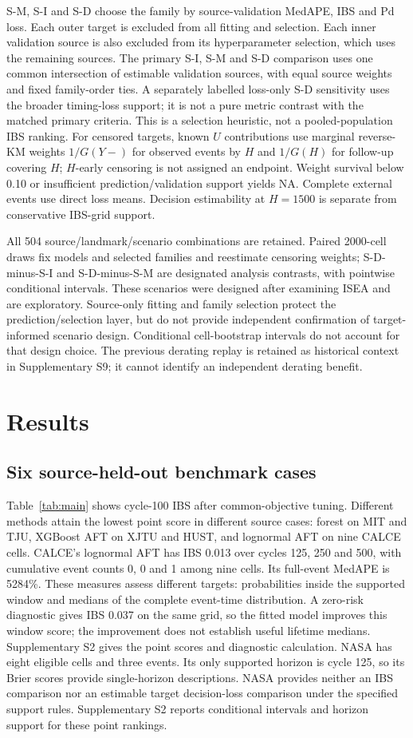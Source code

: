 \documentclass[preprint,12pt]{elsarticle}
\begin{document}
S-M, S-I and S-D choose the family by source-validation MedAPE, IBS and Pd loss. Each outer target is excluded from all fitting and selection. Each inner validation source is also excluded from its hyperparameter selection, which uses the remaining sources. The primary S-I, S-M and S-D comparison uses one common intersection of estimable validation sources, with equal source weights and fixed family-order ties. A separately labelled loss-only S-D sensitivity uses the broader timing-loss support; it is not a pure metric contrast with the matched primary criteria. This is a selection heuristic, not a pooled-population IBS ranking. For censored targets, known $U$ contributions use marginal reverse-KM weights $1/G(Y-)$ for observed events by $H$ and $1/G(H)$ for follow-up covering $H$; $H$-early censoring is not assigned an endpoint. Weight survival below 0.10 or insufficient prediction/validation support yields NA. Complete external events use direct loss means. Decision estimability at $H=1500$ is separate from conservative IBS-grid support.

All 504 source/landmark/scenario combinations are retained. Paired 2000-cell draws fix models and selected families and reestimate censoring weights; S-D-minus-S-I and S-D-minus-S-M are designated analysis contrasts, with pointwise conditional intervals. These scenarios were designed after examining ISEA and are exploratory. Source-only fitting and family selection protect the prediction/selection layer, but do not provide independent confirmation of target-informed scenario design. Conditional cell-bootstrap intervals do not account for that design choice. The previous derating replay is retained as historical context in Supplementary S9; it cannot identify an independent derating benefit.
\section{Results}
\subsection{Six source-held-out benchmark cases}
Table~\ref{tab:main} shows cycle-100 IBS after common-objective tuning. Different methods attain the lowest point score in different source cases: forest on MIT and TJU, XGBoost AFT on XJTU and HUST, and lognormal AFT on nine CALCE cells. CALCE's lognormal AFT has IBS 0.013 over cycles 125, 250 and 500, with cumulative event counts 0, 0 and 1 among nine cells. Its full-event MedAPE is 5284\%. These measures assess different targets: probabilities inside the supported window and medians of the complete event-time distribution. A zero-risk diagnostic gives IBS 0.037 on the same grid, so the fitted model improves this window score; the improvement does not establish useful lifetime medians. Supplementary S2 gives the point scores and diagnostic calculation. NASA has eight eligible cells and three events. Its only supported horizon is cycle 125, so its Brier scores provide single-horizon descriptions. NASA provides neither an IBS comparison nor an estimable target decision-loss comparison under the specified support rules. Supplementary S2 reports conditional intervals and horizon support for these point rankings.
\end{document}
